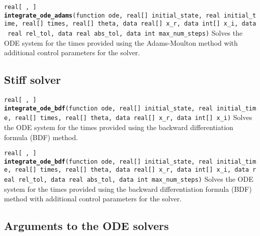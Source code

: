 \documentclass[
  10pt,
]{book}
\begin{document}

\texttt{real{[}\ ,\ {]}} \textbf{\texttt{integrate\_ode\_adams}}\texttt{(function\ ode,\ real{[}{]}\ initial\_state,\ real\ initial\_time,\ real{[}{]}\ times,\ real{[}{]}\ theta,\ data\ real{[}{]}\ x\_r,\ data\ int{[}{]}\ x\_i,\ data\ real\ rel\_tol,\ data\ real\ abs\_tol,\ data\ int\ max\_num\_steps)}\newline
Solves the ODE system for the times provided using the Adams-Moulton
method with additional control parameters for the solver.

\hypertarget{stiff-solver-1}{%
\subsection{Stiff solver}\label{stiff-solver-1}}


\texttt{real{[}\ ,\ {]}} \textbf{\texttt{integrate\_ode\_bdf}}\texttt{(function\ ode,\ real{[}{]}\ initial\_state,\ real\ initial\_time,\ real{[}{]}\ times,\ real{[}{]}\ theta,\ data\ real{[}{]}\ x\_r,\ data\ int{[}{]}\ x\_i)}\newline
Solves the ODE system for the times provided using the backward differentiation
formula (BDF) method.


\texttt{real{[}\ ,\ {]}} \textbf{\texttt{integrate\_ode\_bdf}}\texttt{(function\ ode,\ real{[}{]}\ initial\_state,\ real\ initial\_time,\ real{[}{]}\ times,\ real{[}{]}\ theta,\ data\ real{[}{]}\ x\_r,\ data\ int{[}{]}\ x\_i,\ data\ real\ rel\_tol,\ data\ real\ abs\_tol,\ data\ int\ max\_num\_steps)}\newline
Solves the ODE system for the times provided using the backward differentiation
formula (BDF) method with additional control parameters for the solver.

\hypertarget{arguments-to-the-ode-solvers-1}{%
\subsection{Arguments to the ODE solvers}\label{arguments-to-the-ode-solvers-1}}
\end{document}
